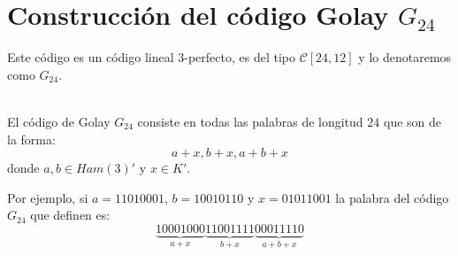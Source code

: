 %
%

\section{Construcci\'on del c\'odigo Golay $G_{24}$}

Este c\'odigo es un c\'odigo lineal $3$-perfecto, es del tipo
$\mathcal{C}[24,12]$ y lo denotaremos como $G_{24}$.\\

\begin{definicion}
\ \\
El c\'odigo de Golay $G_{24}$ consiste en todas las palabras de longitud $24$
que son de la forma:
\begin{displaymath}
a+x,b+x,a+b+x
\end{displaymath}
donde $a,b\in Ham(3)'$ y $x\in K'$.
\end{definicion}
Por ejemplo, si $a=11010001$, $b=10010110$ y $x=01011001$ la palabra del
c\'odigo $G_{24}$ que definen es:
\begin{displaymath}
\underbrace{10001000}_{a+x}\underbrace{11001111}_{b+x}\underbrace{00011110}_{a+b+x}
\end{displaymath}


